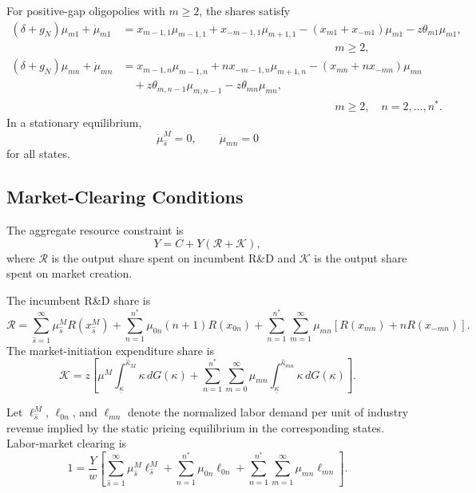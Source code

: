 \documentclass[12pt]{article}
\begin{document}
For positive-gap oligopolies with \(m\geq 2\), the shares satisfy
\begin{align}
(\delta+g_N)\mu_{m1}+\dot{\mu}_{m1}
&=
x_{m-1,1}\mu_{m-1,1}
+x_{-m-1,1}\mu_{m+1,1}
-(x_{m1}+x_{-m1})\mu_{m1}
-z\theta_{m1}\mu_{m1},
\nonumber\\
&\hspace{8cm} m\geq 2,
\label{eq:mum1_app}\\
(\delta+g_N)\mu_{mn}+\dot{\mu}_{mn}
&=
x_{m-1,n}\mu_{m-1,n}
+nx_{-m-1,n}\mu_{m+1,n}
-(x_{mn}+nx_{-mn})\mu_{mn}
\nonumber\\
&\quad
+z\theta_{m,n-1}\mu_{m,n-1}
-z\theta_{mn}\mu_{mn},
\nonumber\\
&\hspace{8cm} m\geq 2,\quad n=2,\ldots,n^* .
\label{eq:mumn_app}
\end{align}
In a stationary equilibrium,
\[
\dot{\mu}^M_{\hat s}=0,
\qquad
\dot{\mu}_{mn}=0
\]
for all states.

\subsection{Market-Clearing Conditions}\label{app:market_clearing}

The aggregate resource constraint is
\begin{equation}
Y=C+Y(\mathcal R+\mathcal K),
\label{eq:resource_app}
\end{equation}
where \(\mathcal R\) is the output share spent on incumbent R\&D and \(\mathcal K\) is the
output share spent on market creation.

The incumbent R\&D share is
\begin{equation}
\mathcal R
=
\sum_{\hat s=1}^{\infty}\mu^M_{\hat s}R(x^M_{\hat s})
+
\sum_{n=1}^{n^*}\mu_{0n}(n+1)R(x_{0n})
+
\sum_{n=1}^{n^*}\sum_{m=1}^{\infty}
\mu_{mn}\left[
R(x_{mn})+nR(x_{-mn})
\right].
\label{eq:R_share_app}
\end{equation}
The market-initiation expenditure share is
\begin{equation}
\mathcal K
=
z\left[
\mu^M\int_{\underline{\kappa}}^{\hat{\kappa}_M}\kappa\,dG(\kappa)
+
\sum_{n=1}^{n^*}\sum_{m=0}^{\infty}
\mu_{mn}
\int_{\underline{\kappa}}^{\hat{\kappa}_{mn}}\kappa\,dG(\kappa)
\right].
\label{eq:K_share_app}
\end{equation}

Let \(\ell^M_{\hat s}\), \(\ell_{0n}\), and \(\ell_{mn}\) denote the normalized labor demand
per unit of industry revenue implied by the static pricing equilibrium in the corresponding
states. Labor-market clearing is
\begin{equation}
1
=
\frac{Y}{w}
\left[
\sum_{\hat s=1}^{\infty}\mu^M_{\hat s}\ell^M_{\hat s}
+
\sum_{n=1}^{n^*}\mu_{0n}\ell_{0n}
+
\sum_{n=1}^{n^*}\sum_{m=1}^{\infty}\mu_{mn}\ell_{mn}
\right].
\label{eq:labor_app}
\end{equation}
\end{document}
